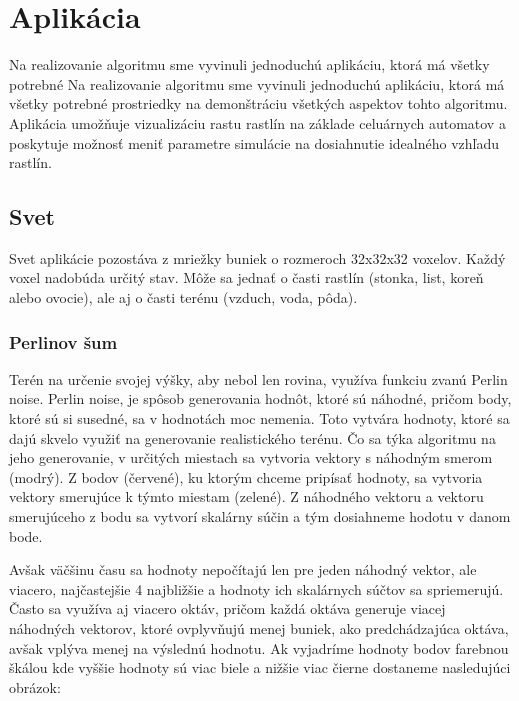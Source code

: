 \documentclass[12pt]{article}
\begin{document}
\section{Aplikácia}

Na realizovanie algoritmu sme vyvinuli jednoduchú aplikáciu, ktorá má všetky
potrebné Na realizovanie algoritmu sme vyvinuli jednoduchú aplikáciu, ktorá má
všetky potrebné prostriedky na demonštráciu všetkých aspektov tohto algoritmu.
Aplikácia umožňuje vizualizáciu rastu rastlín na základe celuárnych automatov
a poskytuje možnosť meniť parametre simulácie na dosiahnutie idealného vzhľadu
rastlín.

\subsection{Svet}

Svet aplikácie pozostáva z mriežky buniek o rozmeroch 32x32x32 voxelov.
Každý voxel nadobúda určitý stav. Môže sa jednať o časti rastlín (stonka, list,
koreň alebo ovocie), ale aj o časti terénu (vzduch, voda, pôda).

\subsubsection{Perlinov šum}

Terén na určenie svojej výšky, aby nebol len rovina, využíva funkciu zvanú
Perlin noise. Perlin noise, je spôsob generovania hodnôt, ktoré sú náhodné,
pričom body, ktoré sú si susedné, sa v hodnotách moc nemenia. Toto vytvára
hodnoty, ktoré sa dajú skvelo využiť na generovanie realistického terénu.
Čo sa týka algoritmu na jeho generovanie, v určitých miestach sa vytvoria
vektory s náhodným smerom (modrý). Z bodov (červené), ku ktorým chceme pripísať
hodnoty, sa vytvoria vektory smerujúce k týmto miestam (zelené). Z náhodného
vektoru a vektoru smerujúceho z bodu sa vytvorí skalárny súčin a tým dosiahneme
hodotu v danom bode.

Avšak väčšinu času sa hodnoty nepočítajú len pre jeden náhodný vektor,
ale viacero, najčastejšie 4 najbližšie a hodnoty ich skalárnych súčtov
sa spriemerujú. Často sa využíva aj viacero oktáv, pričom každá oktáva generuje
viacej náhodných vektorov, ktoré ovplyvňujú menej buniek, ako predchádzajúca
oktáva, avšak vplýva menej na výslednú hodnotu. Ak vyjadríme hodnoty bodov
farebnou škálou kde vyššie hodnoty sú viac biele a nižšie viac čierne dostaneme
nasledujúci obrázok:
\end{document}
